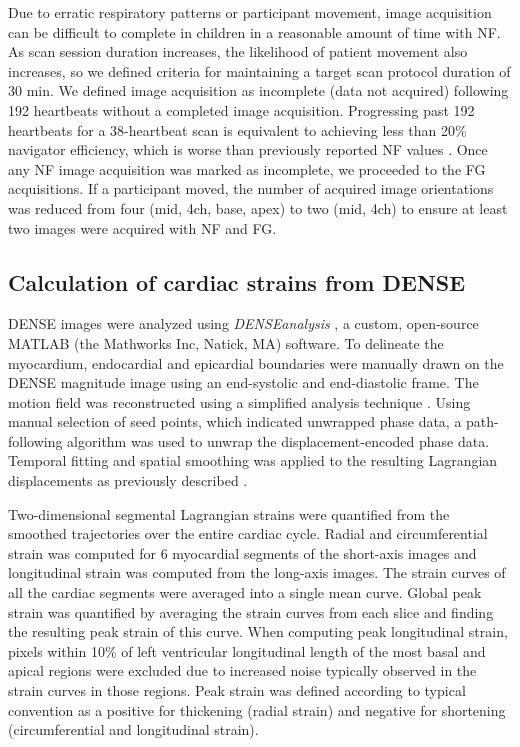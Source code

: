 	Due to erratic respiratory patterns or participant movement, image acquisition can be difficult to complete in children in a reasonable amount of time with NF. As scan session duration increases, the likelihood of patient movement also increases, so we defined criteria for maintaining a target scan protocol duration of 30 min. We defined image acquisition as incomplete (data not acquired) following 192 heartbeats without a completed image acquisition. Progressing past 192 heartbeats for a 38-heartbeat scan is equivalent to achieving less than 20\% navigator efficiency, which is worse than previously reported NF values \cite{Abd-Elmoniem2011,Feuerlein2009,Jhooti2011,Wang1996}. Once any NF image acquisition was marked as incomplete, we proceeded to the FG acquisitions. If a participant moved, the number of acquired image orientations was reduced from four (mid, 4ch, base, apex) to two (mid, 4ch) to ensure at least two images were acquired with NF and FG.

\subsection{Calculation of cardiac strains from DENSE}
	DENSE images were analyzed using \textit{DENSEanalysis} \cite{Gilliam2016a}, a custom, open-source MATLAB (the Mathworks Inc, Natick, MA) software. To delineate the myocardium, endocardial and epicardial boundaries were manually drawn on the DENSE magnitude image using an end-systolic and end-diastolic frame. The motion field was reconstructed using a simplified analysis technique \cite{Suever2014}. Using manual selection of seed points, which indicated unwrapped phase data, a path-following algorithm was used to unwrap the displacement-encoded phase data. Temporal fitting and spatial smoothing was applied to the resulting Lagrangian displacements as previously described \cite{Spottiswoode2007}.
	
	Two-dimensional segmental Lagrangian strains were quantified from the smoothed trajectories over the entire cardiac cycle. Radial and circumferential strain was computed for 6 myocardial segments of the short-axis images and longitudinal strain was computed from the long-axis images. The strain curves of all the cardiac segments were averaged into a single mean curve. Global peak strain was quantified by averaging the strain curves from each slice and finding the resulting peak strain of this curve. When computing peak longitudinal strain, pixels within 10\% of left ventricular longitudinal length of the most basal and apical regions were excluded due to increased noise typically observed in the strain curves in those regions. Peak strain was defined according to typical convention as a positive for thickening (radial strain) and negative for shortening (circumferential and longitudinal strain).


